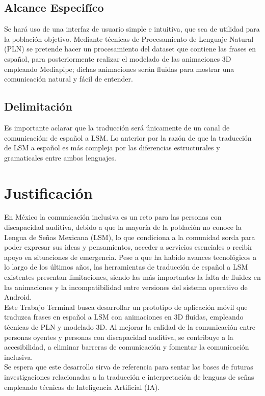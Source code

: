\subsection{Alcance Especifíco}
Se hará uso de una interfaz de usuario simple e intuitiva, que sea de utilidad para la población objetivo. Mediante técnicas de Procesamiento de Lenguaje Natural (PLN) se pretende hacer un procesamiento del dataset que contiene las frases en español, para posteriormente realizar el modelado de las animaciones 3D empleando Mediapipe; dichas animaciones serán fluidas para mostrar una comunicación natural y fácil de entender.

\subsection{Delimitación}
Es importante aclarar que la traducción será únicamente de un canal de comunicación: de español a LSM. Lo anterior por la razón de que la traducción de LSM a español es más compleja por las diferencias estructurales y gramaticales entre ambos lenguajes.\\

\section{Justificación}
En México la comunicación inclusiva es un reto para las personas con discapacidad auditiva, debido a que la mayoría de la población no conoce la Lengua de Señas Mexicana (LSM), lo que condiciona a la comunidad sorda para poder expresar sus ideas y pensamientos, acceder a servicios esenciales o recibir apoyo en situaciones de emergencia. Pese a que ha habido avances tecnológicos a lo largo de los últimos años, las herramientas de traducción de español a LSM existentes presentan limitaciones, siendo las más importantes la falta de fluidez en las animaciones y la incompatibilidad entre versiones del sistema operativo de Android. \\

Este Trabajo Terminal busca desarrollar un prototipo de aplicación móvil que traduzca frases en español a LSM con animaciones en 3D fluidas, empleando técnicas de PLN y modelado 3D. Al mejorar la calidad de la comunicación entre personas oyentes y personas con discapacidad auditiva, se contribuye a la accesibilidad, a eliminar barreras de comunicación y fomentar la comunicación inclusiva.\\

Se espera que este desarrollo sirva de referencia para sentar las bases de futuras investigaciones relacionadas a la traducción e interpretación de lenguas de señas empleando técnicas de Inteligencia Artificial (IA).\\

